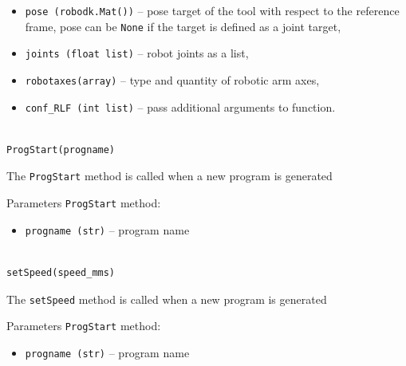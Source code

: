 \begin{itemize}

\item \texttt{pose (robodk.Mat())} -- pose target of the tool with respect to the reference frame, pose can be \texttt{None} if the target is defined as a joint target,

\item \texttt{joints (float list)} -- robot joints as a list,

\item \texttt{robotaxes(array)} -- type and quantity of robotic arm axes,

\item \texttt{conf_RLF (int list)} -- pass additional arguments to function. 

\end{itemize}

\begin{verbatim}

ProgStart(progname)

\end{verbatim}

The \texttt{ProgStart} method is called when a new program is generated


Parameters \texttt{ProgStart} method:

\begin{itemize}

\item \texttt{progname (str)} -- program name

\end{itemize}

\begin{verbatim}

setSpeed(speed_mms)

\end{verbatim}

The \texttt{setSpeed} method is called when a new program is generated


Parameters \texttt{ProgStart} method:

\begin{itemize}

\item \texttt{progname (str)} -- program name

\end{itemize}

